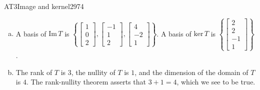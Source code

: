 \begin{exercise}{AT3}{Image and kernel}{2974}
\begin{exerciseAnswer}
\begin{enumerate}[(a)]
 
\item  

 A basis of \(\mathrm{Im}\,T\) is \(\left\{ \left[\begin{array}{c}
1 \\
0 \\
2
\end{array}\right] , \left[\begin{array}{c}
-1 \\
1 \\
2
\end{array}\right] , \left[\begin{array}{c}
4 \\
-2 \\
1
\end{array}\right] \right\}\). A basis of \(\mathrm{ker}\,T\) is \(\left\{ \left[\begin{array}{c}
2 \\
2 \\
-1 \\
1
\end{array}\right] \right\}\). 

 
\item  

 The rank of \(T\) is \(3\), the nullity of \(T\) is \(1\), and the dimension of the domain of \(T\) is \(4\). The rank-nullity theorem asserts that \(3+1=4\), which we see to be true. 

 
\end{enumerate}

     \end{exerciseAnswer}
 \end{exercise}


